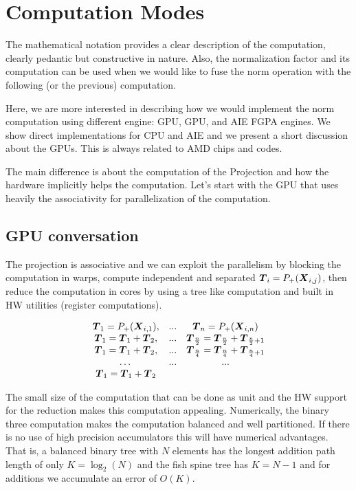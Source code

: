 \documentclass[acmsmall]{acmart}
\begin{document}
\section{Computation Modes} 
The mathematical notation provides a clear description of the
computation, clearly pedantic but constructive in nature. Also, the
normalization factor and its computation can be used when we would
like to fuse the norm operation with the following (or the previous)
computation.

Here, we are more interested in describing how we would implement the
norm computation using different engine: GPU, GPU, and AIE FGPA
engines. We show direct implementations for CPU and AIE and we present
a short discussion about the GPUs. This is always related to AMD chips
and codes.

The main difference is about the computation of the Projection and how
the hardware implicitly helps the computation. Let's start with the
GPU that uses heavily the associativity for parallelization of the
computation.

\subsection{GPU conversation}
The projection is associative and we can exploit the parallelism by
blocking the computation in warps, compute independent and separated
${\boldsymbol T}_i = P_+({\boldsymbol X}_{i,j})$, then reduce the computation in cores
by using a tree like computation and built in HW utilities (register
computations). 

\begin{equation}
  \begin{matrix}
    {\boldsymbol T}_1 = P_+({\boldsymbol X}_{i,1}), & ... &  {\boldsymbol T}_n = P_+({\boldsymbol X}_{i,n}) \\ 
    {\boldsymbol T}_1 = {\boldsymbol T}_1+{\boldsymbol T}_2, & ... &  {\boldsymbol T}_{\frac{n}{2}} = {\boldsymbol T}_{\frac{n}{2}} + {\boldsymbol T}_{\frac{n}{2}+1} \\
    {\boldsymbol T}_1 = {\boldsymbol T}_1 + {\boldsymbol T}_2, & ... &  {\boldsymbol T}_{\frac{n}{4}} = {\boldsymbol T}_{\frac{n}{4}} + {\boldsymbol T}_{\frac{n}{4}+1} \\
    \dots  & ... & ... \\ 
    {\boldsymbol T}_1 = {\boldsymbol T}_1 + {\boldsymbol T}_2 & & \\
  \end{matrix}
\end{equation}

The small size of the computation that can be done as unit and the HW
support for the reduction makes this computation
appealing. Numerically, the binary three computation makes the
computation balanced and well partitioned. If there is no use of high
precision accumulators this will have numerical advantages. That is, a
balanced binary tree with $N$ elements has the longest addition path
length of only $K = \log_2(N)$ and the fish spine tree has $K = N-1$
and for additions we accumulate an error of $O(K)$.
\end{document}

